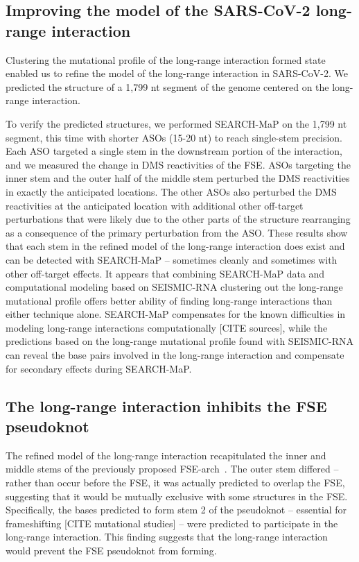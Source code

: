 \documentclass[main.tex]{subfiles}
\begin{document}
\subsection{Improving the model of the SARS-CoV-2 long-range interaction}

Clustering the mutational profile of the long-range interaction formed state enabled us to refine the model of the long-range interaction in SARS-CoV-2.
We predicted the structure of a 1,799 nt segment of the genome centered on the long-range interaction.

To verify the predicted structures, we performed SEARCH-MaP on the 1,799 nt segment, this time with shorter ASOs (15-20 nt) to reach single-stem precision.
Each ASO targeted a single stem in the downstream portion of the interaction, and we measured the change in DMS reactivities of the FSE.
ASOs targeting the inner stem and the outer half of the middle stem perturbed the DMS reactivities in exactly the anticipated locations.
The other ASOs also perturbed the DMS reactivities at the anticipated location with additional other off-target perturbations that were likely due to the other parts of the structure rearranging as a consequence of the primary perturbation from the ASO.
These results show that each stem in the refined model of the long-range interaction does exist and can be detected with SEARCH-MaP -- sometimes cleanly and sometimes with other off-target effects.
It appears that combining SEARCH-MaP data and computational modeling based on SEISMIC-RNA clustering out the long-range mutational profile offers better ability of finding long-range interactions than either technique alone.
SEARCH-MaP compensates for the known difficulties in modeling long-range interactions computationally [CITE sources], while the predictions based on the long-range mutational profile found with SEISMIC-RNA can reveal the base pairs involved in the long-range interaction and compensate for secondary effects during SEARCH-MaP.

\subsection{The long-range interaction inhibits the FSE pseudoknot}

The refined model of the long-range interaction recapitulated the inner and middle stems of the previously proposed FSE-arch~\cite{Ziv2020}.
The outer stem differed -- rather than occur before the FSE, it was actually predicted to overlap the FSE, suggesting that it would be mutually exclusive with some structures in the FSE.
Specifically, the bases predicted to form stem 2 of the pseudoknot -- essential for frameshifting [CITE mutational studies] -- were predicted to participate in the long-range interaction.
This finding suggests that the long-range interaction would prevent the FSE pseudoknot from forming.
\end{document}
